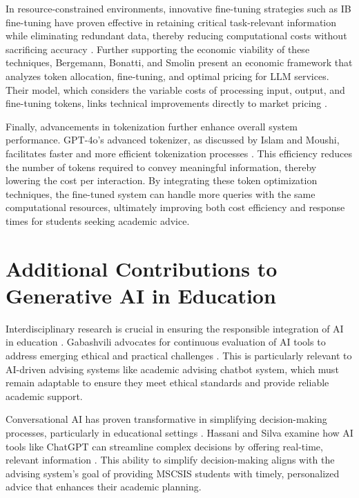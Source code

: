 \documentclass[12pt,oneside,openany]{report}
\begin{document}
In resource-constrained environments, innovative fine-tuning strategies such as IB fine-tuning have proven effective in retaining critical task-relevant information while eliminating redundant data, thereby reducing computational costs without sacrificing accuracy \cite{jo2025efficiency}. Further supporting the economic viability of these techniques, Bergemann, Bonatti, and Smolin present an economic framework that analyzes token allocation, fine-tuning, and optimal pricing for LLM services. Their model, which considers the variable costs of processing input, output, and fine-tuning tokens, links technical improvements directly to market pricing \cite{bergemann2025economics}.

Finally, advancements in tokenization further enhance overall system performance. GPT-4o's advanced tokenizer, as discussed by Islam and Moushi, facilitates faster and more efficient tokenization processes \cite{Islam_2024}. This efficiency reduces the number of tokens required to convey meaningful information, thereby lowering the cost per interaction. By integrating these token optimization techniques, the fine-tuned system can handle more queries with the same computational resources, ultimately improving both cost efficiency and response times for students seeking academic advice.



\section{Additional Contributions to Generative AI in Education} 

Interdisciplinary research is crucial in ensuring the responsible integration of AI in education \cite{arxiv230518086}. Gabashvili  advocates for continuous evaluation of AI tools to address emerging ethical and practical challenges \cite{arxiv230518086}. This is particularly relevant to AI-driven advising systems like academic advising chatbot system, which must remain adaptable to ensure they meet ethical standards and provide reliable academic support.

Conversational AI has proven transformative in simplifying decision-making processes, particularly in educational settings \cite{bdcc7020062}. Hassani and Silva  examine how AI tools like ChatGPT can streamline complex decisions by offering real-time, relevant information \cite{bdcc7020062}. This ability to simplify decision-making aligns with the advising system's goal of providing MSCSIS students with timely, personalized advice that enhances their academic planning.
\end{document}
